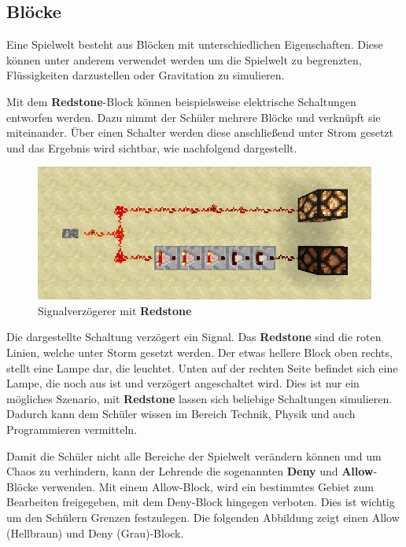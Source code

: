 \subsection{Blöcke}
Eine Spielwelt besteht aus Blöcken mit unterschiedlichen Eigenschaften. Diese können unter anderem verwendet werden um die Spielwelt zu begrenzten, Flüssigkeiten darzustellen oder Gravitation zu simulieren.

Mit dem \textbf{Redstone}-Block können beispielsweise elektrische Schaltungen entworfen werden. Dazu nimmt der Schüler mehrere Blöcke und verknüpft sie miteinander. Über einen Schalter werden diese anschließend unter Strom gesetzt und das Ergebnis wird sichtbar, wie nachfolgend dargestellt.

\begin{figure}[ht]
	\centering
	\includegraphics[width=\textwidth,height=\textheight,keepaspectratio]{images/RedstoneSignalverzoegerer.png}
	\caption{Signalverzögerer mit \textbf{Redstone} \cite{GamepediaMinecraft}}
	\label{redstoneSignalDelay}
\end{figure}

Die dargestellte Schaltung verzögert ein Signal. Das \textbf{Redstone} sind die roten Linien, welche unter Storm gesetzt werden. Der etwas hellere Block oben rechts, stellt eine Lampe dar, die leuchtet. Unten auf der rechten Seite befindet sich eine Lampe, die noch aus ist und verzögert angeschaltet wird.
Dies ist nur ein mögliches Szenario, mit \textbf{Redstone} lassen sich beliebige Schaltungen simulieren.
Dadurch kann dem Schüler wissen im Bereich Technik, Physik und auch Programmieren vermitteln.

Damit die Schüler nicht alle Bereiche der Spielwelt verändern können und um Chaos zu verhindern, kann der Lehrende die sogenannten \textbf{Deny} und \textbf{Allow}-Blöcke verwenden. Mit einem Allow-Block, wird ein bestimmtes Gebiet zum Bearbeiten freigegeben, mit dem Deny-Block hingegen verboten. Dies ist wichtig um den Schülern Grenzen festzulegen.
Die folgenden Abbildung zeigt einen Allow (Hellbraun) und Deny (Grau)-Block.

